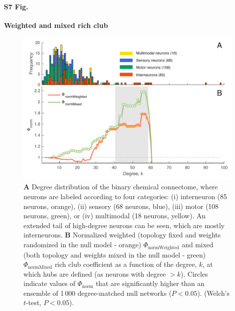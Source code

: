 \documentclass[10pt,letterpaper]{article}
\begin{document}
\paragraph*{S7 Fig.}
{\bf Weighted and mixed rich club}
\begin{figure}[!h]
\label{WeightedRC}
\centering
    \includegraphics[width=1\textwidth]{WeightedMixedRC.pdf}
    \caption{\textbf{A} Degree distribution of the binary chemical connectome, where neurons are labeled according to four categories:
(i) interneuron (85 neurons, orange),
(ii) sensory (68 neurons, blue),
(iii) motor (108 neurons, green), or
(iv) multimodal (18 neurons, yellow).
An extended tail of high-degree neurons can be seen, which are mostly interneurons.
\textbf{B}
Normalized weighted (topology fixed and weights randomized in the null model - orange) $\Phi_\mathrm{normWeighted}$ and mixed (both topology and weights mixed in the null model - green) $\Phi_\mathrm{normMixed}$ rich club coefficient as a function of the degree, $k$, at which hubs are defined (as neurons with degree $>k$).
Circles indicate values of $\Phi_\mathrm{norm}$ that are significantly higher than an ensemble of 1\,000 degree-matched null networks ($P < 0.05$).
(Welch's $t$-test, $P < 0.05$).
}
\end{figure}

\end{document}
